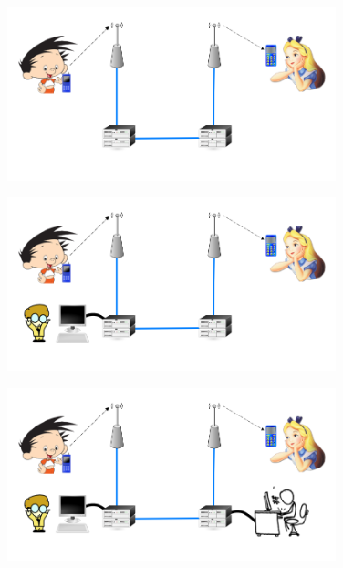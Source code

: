 \documentclass[notes,blue,mathserif]{beamer}
\begin{document}
\begin{frame}{}
\begin{figure}
	\centering
		\includegraphics[width=0.85\textwidth]{figuras/2.png}
	\label{fig:arq2}
\end{figure}
\end{frame}

\begin{frame}{}
\begin{figure}
	\centering
		\includegraphics[width=0.85\textwidth]{figuras/3.png}
	\label{fig:arq3}
\end{figure}
\end{frame}

\begin{frame}{}
\begin{figure}
	\centering
		\includegraphics[width=0.85\textwidth]{figuras/4.png}
	\label{fig:arq4}
\end{figure}
\end{frame}
\end{document}
